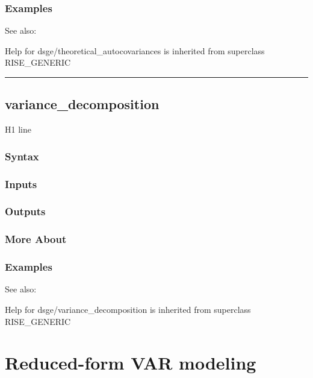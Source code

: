 \documentclass[letterpaper,10pt,english]{sphinxmanual}
\begin{document}
\subsection{Examples}
\label{classes/models/@dsge/dsge:id217}
See also:

Help for dsge/theoretical\_autocovariances is inherited from superclass RISE\_GENERIC


\bigskip\hrule{}\bigskip



\section{variance\_decomposition}
\label{classes/models/@dsge/dsge:id218}\label{classes/models/@dsge/dsge:variance-decomposition}
H1 line


\subsection{Syntax}
\label{classes/models/@dsge/dsge:id219}

\subsection{Inputs}
\label{classes/models/@dsge/dsge:id220}

\subsection{Outputs}
\label{classes/models/@dsge/dsge:id221}

\subsection{More About}
\label{classes/models/@dsge/dsge:id222}

\subsection{Examples}
\label{classes/models/@dsge/dsge:id223}
See also:

Help for dsge/variance\_decomposition is inherited from superclass RISE\_GENERIC


\chapter{Reduced-form VAR modeling}
\label{classes/models/@rfvar/rfvar::doc}\label{classes/models/@rfvar/rfvar:reduced-form-var-modeling}
\end{document}
